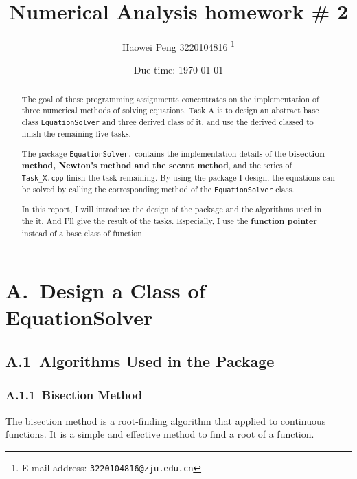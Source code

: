 \documentclass[a4paper]{article}
\begin{document}
\title{\textbf{Numerical Analysis homework \# 2}}

\author{Haowei Peng 3220104816
  \thanks{E-mail address: \texttt{3220104816@zju.edu.cn}}}

\date{Due time: \today}

\maketitle

\begin{abstract}
    The goal of these programming assignments concentrates on the implementation of three numerical methods of solving equations.
    Task A is to design an abstract base class \verb|EquationSolver| and three derived class of it, and use the derived classed to finish the remaining five tasks.
    
    The package \verb|EquationSolver.| contains the implementation details of the \textbf{bisection method, Newton's method and the secant method}, and the series of \verb|Task_X.cpp| finish the task remaining.
    By using the package I design, the equations can be solved by calling the corresponding method of the \verb|EquationSolver| class.

    In this report, I will introduce the design of the package and the algorithms used in the it. 
    And I'll give the result of the tasks. 
    Especially, I use the \textbf{function pointer} instead of a base class of function.
\end{abstract}

\section*{A.\ Design a Class of EquationSolver}

\subsection*{A.1\ Algorithms Used in the Package}

\subsubsection*{A.1.1\ Bisection Method}

The bisection method is a root-finding algorithm that applied to continuous functions. It is a simple and effective method to find a root of a function. 
\end{document}

